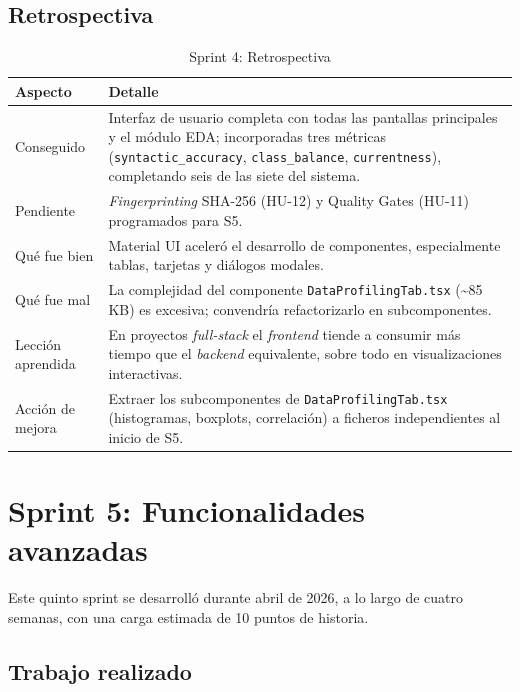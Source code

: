 \subsection{Retrospectiva}

\begin{table}[htbp]
  \centering
  \small
  \caption{Sprint 4: Retrospectiva}
  \label{tab:sprint4-retro}
  \begin{tabularx}{\textwidth}{l X}
    \toprule
    \textbf{Aspecto} & \textbf{Detalle} \\
    \midrule
    Conseguido & Interfaz de usuario completa con todas las pantallas
      principales y el módulo \ac{EDA}; incorporadas tres métricas
      (\texttt{syntactic\_accuracy}, \texttt{class\_balance},
      \texttt{currentness}), completando seis de las siete del sistema. \\
    Pendiente & \emph{Fingerprinting} SHA-256 (HU-12) y Quality Gates (HU-11)
      programados para S5. \\
    Qué fue bien & Material \ac{UI} aceleró el desarrollo de componentes,
      especialmente tablas, tarjetas y diálogos modales. \\
    Qué fue mal & La complejidad del componente \texttt{DataProfilingTab.tsx}
      (\textasciitilde85\,KB) es excesiva; convendría refactorizarlo en
      subcomponentes. \\
    Lección aprendida & En proyectos \emph{full-stack} el \emph{frontend}
      tiende a consumir más tiempo que el \emph{backend} equivalente, sobre
      todo en visualizaciones interactivas. \\
    Acción de mejora & Extraer los subcomponentes de
      \texttt{DataProfilingTab.tsx} (histogramas, boxplots, correlación) a
      ficheros independientes al inicio de S5. \\
    \bottomrule
  \end{tabularx}
\end{table}


\section{Sprint 5: Funcionalidades avanzadas}
\label{sec:sprint5}
Este quinto sprint se desarrolló durante abril de 2026, a lo largo de cuatro
semanas, con una carga estimada de 10 puntos de historia.

\subsection{Trabajo realizado}

